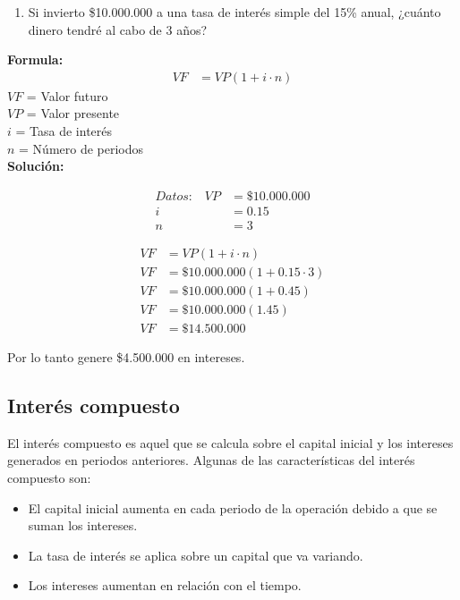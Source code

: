 \documentclass{templateNote}
\begin{document}
\begin{tcolorbox}[colback=blue!10!white,colframe=blue!60!black,title=Ejemplo]
    \begin{enumerate}
        \item Si invierto \$10.000.000 a una tasa de interés simple del 15\% anual, ¿cuánto dinero tendré al cabo de 3 años?
    \end{enumerate}
    \textbf{Formula:}
    \begin{align*}
        VF &= VP(1 + i \cdot n)
    \end{align*}
    $VF$ = Valor futuro\\
    $VP$ = Valor presente\\
    $i$ = Tasa de interés\\
    $n$ = Número de periodos\\
    \textbf{Solución:}\\
    \begin{minipage}{0.5\textwidth}
        \begin{align*}
            \textit{Datos:} \quad
            VP &= \$10.000.000\\
            i &= 0.15\\
            n &= 3
        \end{align*}
    \end{minipage}
    \begin{minipage}{0.5\textwidth}
        \begin{align*}
            VF &= VP(1 + i \cdot n)\\
            VF &= \$10.000.000(1 + 0.15 \cdot 3)\\
            VF &= \$10.000.000(1 + 0.45)\\
            VF &= \$10.000.000(1.45)\\
            VF &= \$14.500.000
        \end{align*}
    \end{minipage}
    \center Por lo tanto genere \$4.500.000 en intereses.
\end{tcolorbox}


\subsection{Interés compuesto}
\noindent El interés compuesto es aquel que se calcula sobre el capital inicial y los intereses generados en periodos anteriores. Algunas de las características del interés compuesto son:
\begin{itemize}
    \item El capital inicial aumenta en cada periodo de la operación debido a que se suman los intereses.
    \item La tasa de interés se aplica sobre un capital que va variando.
    \item Los intereses aumentan en relación con el tiempo.
\end{itemize}
\end{document}
